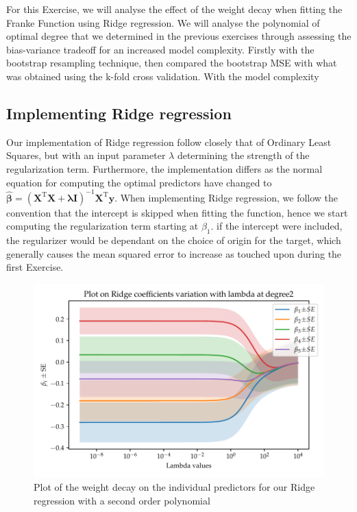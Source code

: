\documentclass[11pt, a4paper]{article}
\begin{document}
For this Exercise, we will analyse the effect of the weight decay when fitting the Franke Function using Ridge regression. We will analyse the polynomial of optimal degree that we determined in the previous exercises through assessing the bias-variance tradeoff for an increased model complexity. Firstly with the bootstrap resampling technique, then compared the bootstrap MSE with what was obtained using the k-fold cross validation. With the model complexity

\subsection*{Implementing Ridge regression}
Our implementation of Ridge regression follow closely that of Ordinary Least Squares, but with an input parameter $\lambda$ determining the strength of the regularization term. Furthermore, the implementation differs as the normal equation for computing the optimal predictors have changed to $\bm{\hat{\beta}} = \left(\bm{X}^\text{T}\bm{X} + \bm{\lambda}\bm{I}\right)^{-1}\bm{X}^\text{T}\bm{y}$. When implementing Ridge regression, we follow the convention that the intercept is skipped when fitting the function, hence we start computing the regularization term starting at $\beta_1$. \cite{Geron2019} if the intercept were included, the regularizer would be dependant on the choice of origin for the target, which generally causes the mean squared error to increase as touched upon during the first Exercise.

\begin{figure}
  \centering
  \includegraphics[scale=0.75]{figures/EX4_beta_plot_ridge_2.pdf}
  \caption{\label{fig:ridge_beta_1}Plot of the weight decay on the individual predictors for our Ridge regression with a second order polynomial}
\end{figure}
\end{document}
